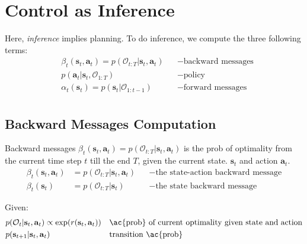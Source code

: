 \section{Control as Inference}
\label{sec:control-as-inference}

Here, \textit{inference} implies planning. To do inference, we compute the three following terms:
\begin{align*}
	&\beta_t (\textbf{s}_t, \textbf{a}_t) = p(\mathcal{O}_{t:T}| \textbf{s}_t, \textbf{a}_t) && -\text{backward messages}\\
	&p(\textbf{a}_t | \textbf{s}_t, \mathcal{O}_{1:T}) && -\text{policy}\\
	&\alpha_t(\textbf{s}_t) = p(\textbf{s}_t | \mathcal{O}_{1:t-1}) && -\text{forward messages}\\
\end{align*}

\subsection{Backward Messages Computation}
Backward messages $\beta_t (\textbf{s}_t, \textbf{a}_t) = p(\mathcal{O}_{t:T}| \textbf{s}_t, \textbf{a}_t)$ is the \ac{prob} of optimality from the current time step $t$ till the end $T$, given the current state. $\textbf{s}_t$ and action $\textbf{a}_t$.
\begin{align*}
	\beta_t (\textbf{s}_t, \textbf{a}_t) &= p(\mathcal{O}_{t:T}| \textbf{s}_t, \textbf{a}_t) && -\text{the state-action backward message}\\
	\beta_t (\textbf{s}_t) &= p(\mathcal{O}_{t:T}| \textbf{s}_t) && -\text{the state backward message}
\end{align*}

Given:
\begin{align*}
	&p(\mathcal{O}_t| \textbf{s}_t, \textbf{a}_t) \propto \exp (r(\textbf{s}_t, \textbf{a}_t)) && \text{\ac{prob} of current optimality given state and action}\\
	&p(\textbf{s}_{t+1} | \textbf{s}_t, \textbf{a}_t) && \text{transition \ac{prob}}
\end{align*}

